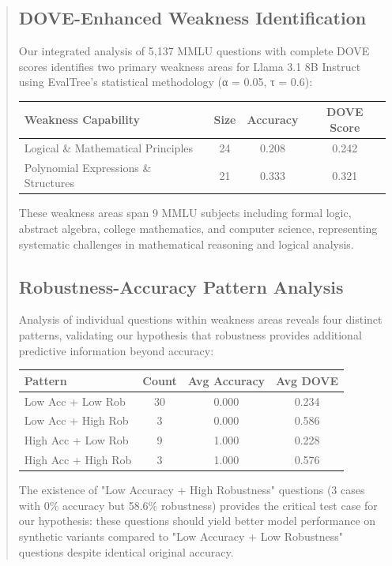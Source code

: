 \documentclass[11pt]{article}
\begin{document}
\begin{abstract}
\subsection{DOVE-Enhanced Weakness Identification}

Our integrated analysis of 5,137 MMLU questions with complete DOVE scores identifies two primary weakness areas for Llama 3.1 8B Instruct using EvalTree's statistical methodology (α = 0.05, τ = 0.6):

\begin{center}
\begin{tabular}{lccc}
\hline
\textbf{Weakness Capability} & \textbf{Size} & \textbf{Accuracy} & \textbf{DOVE Score} \\
\hline
Logical \& Mathematical Principles & 24 & 0.208 & 0.242 \\
Polynomial Expressions \& Structures & 21 & 0.333 & 0.321 \\
\hline
\end{tabular}
\end{center}

These weakness areas span 9 MMLU subjects including formal logic, abstract algebra, college mathematics, and computer science, representing systematic challenges in mathematical reasoning and logical analysis.

\subsection{Robustness-Accuracy Pattern Analysis}

Analysis of individual questions within weakness areas reveals four distinct patterns, validating our hypothesis that robustness provides additional predictive information beyond accuracy:

\begin{center}
\begin{tabular}{lccc}
\hline
\textbf{Pattern} & \textbf{Count} & \textbf{Avg Accuracy} & \textbf{Avg DOVE} \\
\hline
Low Acc + Low Rob & 30 & 0.000 & 0.234 \\
Low Acc + High Rob & 3 & 0.000 & 0.586 \\
High Acc + Low Rob & 9 & 1.000 & 0.228 \\
High Acc + High Rob & 3 & 1.000 & 0.576 \\
\hline
\end{tabular}
\end{center}

The existence of "Low Accuracy + High Robustness" questions (3 cases with 0\% accuracy but 58.6\% robustness) provides the critical test case for our hypothesis: these questions should yield better model performance on synthetic variants compared to "Low Accuracy + Low Robustness" questions despite identical original accuracy.


\end{abstract}
\end{document}

